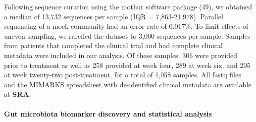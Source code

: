 \documentclass[12pt,]{article}
\let\oldparagraph\paragraph
\renewcommand{\paragraph}[1]{\oldparagraph{#1}\mbox{}}
\begin{document}
Following sequence curation using the mothur software package (49), we
obtained a median of 13,732 sequences per sample (IQR = 7,863-21,978).
Parallel sequencing of a mock community had an error rate of 0.017\%. To
limit effects of uneven sampling, we rarefied the dataset to 3,000
sequences per sample. Samples from patients that completed the clinical
trial and had complete clinical metadata were included in our analysis.
Of these samples, 306 were provided prior to treatment as well as 258
provided at week four, 289 at week six, and 205 at week twenty-two
post-treatment, for a total of 1,058 samples. All fastq files and the
MIMARKS spreadsheet with de-identified clinical metadata are available
at \textbf{SRA}.

\paragraph{Gut microbiota biomarker discovery and statistical
analysis}\label{gut-microbiota-biomarker-discovery-and-statistical-analysis}
\end{document}
